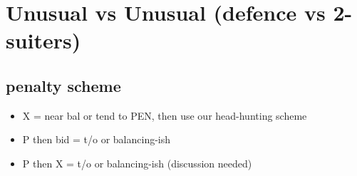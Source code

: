 \section{Unusual vs Unusual (defence vs 2-suiters)}


\subsection{penalty scheme}

\begin{itemize}
    \setlength\itemsep{0pt}
    \item X = near bal or tend to PEN, then use our head-hunting scheme
    \item P then bid = t/o or balancing-ish 
    \item P then X = t/o or balancing-ish (discussion needed)
\end{itemize}